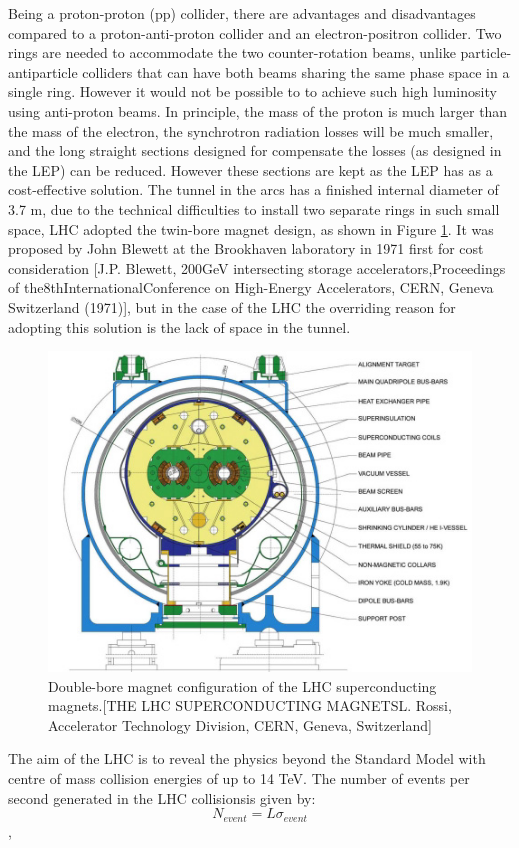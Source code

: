 \documentclass[letterpaper,12pt]{article}
\begin{document}
	Being a proton-proton (pp) collider, there are advantages 
	and disadvantages compared to a
	proton-anti-proton collider and an electron-positron collider. 
	Two rings are needed to accommodate the two 
	counter-rotation beams, unlike particle-antiparticle 
	colliders that can have both beams sharing the same 
	phase space in a single ring.
	However it would not be possible to to 
	achieve such high luminosity using
	anti-proton beams. 
	In principle, the mass of the proton is much larger than 
	the mass of the electron, the
	synchrotron radiation losses will be much smaller, and 
	the long straight sections designed for
	compensate the losses (as designed in the LEP) can be reduced. 
	However these sections are kept 
	as the LEP has as a cost-effective solution. 
	The tunnel in the arcs has a finished internal diameter of 3.7 m, 
	due to the technical difficulties to install 
	two separate rings in such small space,
	LHC adopted the twin-bore magnet design, 
	as shown in Figure \ref{fig:double-bore-magnet}.
	It was proposed by John Blewett at the Brookhaven 
	laboratory in 1971 first for
	cost consideration [J.P. Blewett, 200GeV intersecting storage accelerators,Proceedings of the8thInternationalConference on High-Energy Accelerators, CERN, Geneva Switzerland (1971)],
	but in the case of the LHC the overriding reason for adopting this solution
	is the lack of space in the tunnel. 

	\begin{figure}[]
		\begin{centering}	
		\includegraphics[width=.4\textwidth]{Detector_plots/LHC-double-bore-magnet.jpg}
		\caption{ Double-bore magnet configuration of the LHC superconducting magnets.[THE LHC SUPERCONDUCTING MAGNETSL. Rossi, Accelerator Technology Division, CERN, Geneva, Switzerland]
			}
		\label{fig:double-bore-magnet}
		\end{centering}
	\end{figure}

	The aim of the LHC is to reveal the physics beyond
	the Standard Model with centre of mass 
	collision energies of up to 14 TeV.
	The number of events per second generated in the LHC collisionsis given by:
	\[
		N_{event} = L\sigma_{event}\],
\end{document}
